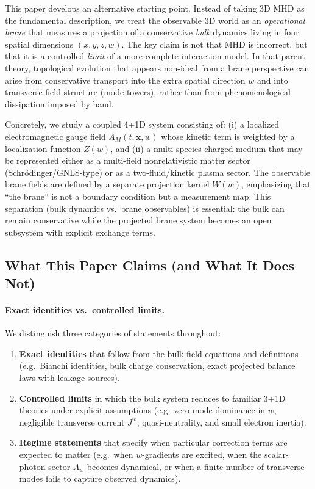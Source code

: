 \documentclass[11pt]{article}
\newcommand{\x}{\mathbf{x}}     %
\begin{document}
This paper develops an alternative starting point. Instead of taking 3D MHD as the fundamental description, we treat the observable 3D world as an \emph{operational brane} that measures a projection of a conservative \emph{bulk} dynamics living in four spatial dimensions \((x,y,z,w)\). The key claim is not that MHD is incorrect, but that it is a controlled \emph{limit} of a more complete interaction model. In that parent theory, topological evolution that appears non-ideal from a brane perspective can arise from conservative transport into the extra spatial direction \(w\) and into transverse field structure (mode towers), rather than from phenomenological dissipation imposed by hand.

Concretely, we study a coupled 4+1D system consisting of:
(i) a localized electromagnetic gauge field \(A_M(t,\x,w)\) whose kinetic term is weighted by a localization function \(Z(w)\), and
(ii) a multi-species charged medium that may be represented either as a multi-field nonrelativistic matter sector (Schr\"odinger/GNLS-type) or as a two-fluid/kinetic plasma sector.
The observable brane fields are defined by a separate projection kernel \(W(w)\), emphasizing that ``the brane'' is not a boundary condition but a measurement map. This separation (bulk dynamics vs.\ brane observables) is essential: the bulk can remain conservative while the projected brane system becomes an open subsystem with explicit exchange terms.

\subsection{What This Paper Claims (and What It Does Not)}
\label{sec:claims_scope}

\paragraph{Exact identities vs.\ controlled limits.}
We distinguish three categories of statements throughout:
\begin{enumerate}[leftmargin=1.5em]
\item \textbf{Exact identities} that follow from the bulk field equations and definitions (e.g.\ Bianchi identities, bulk charge conservation, exact projected balance laws with leakage sources).
\item \textbf{Controlled limits} in which the bulk system reduces to familiar 3+1D theories under explicit assumptions (e.g.\ zero-mode dominance in \(w\), negligible transverse current \(J^w\), quasi-neutrality, and small electron inertia).
\item \textbf{Regime statements} that specify when particular correction terms are expected to matter (e.g.\ when \(w\)-gradients are excited, when the scalar-photon sector \(A_w\) becomes dynamical, or when a finite number of transverse modes fails to capture observed dynamics).
\end{enumerate}
\end{document}
